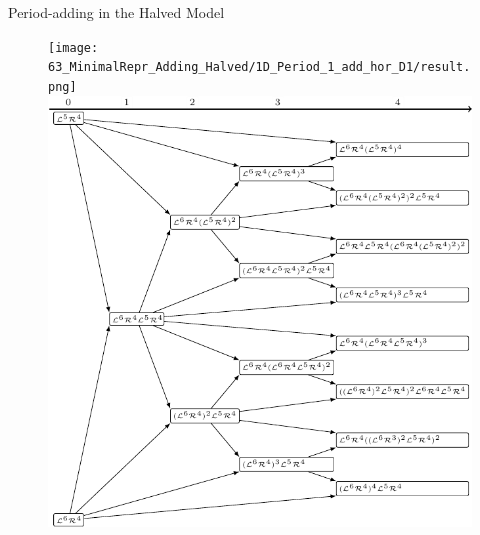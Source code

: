 \begin{frame}{Period-adding in the Halved Model}
	\begin{figure}
		\texttt{[image: 63\_MinimalRepr\_Adding\_Halved/1D\_Period\_1\_add\_hor\_D1/result.png]}
		\quad
		\includegraphics[width=.4 \textwidth]{../../Report/Figures/FareyTrees/Minrep_Adding1_Halved/adding.pdf}
	\end{figure}
\end{frame}

